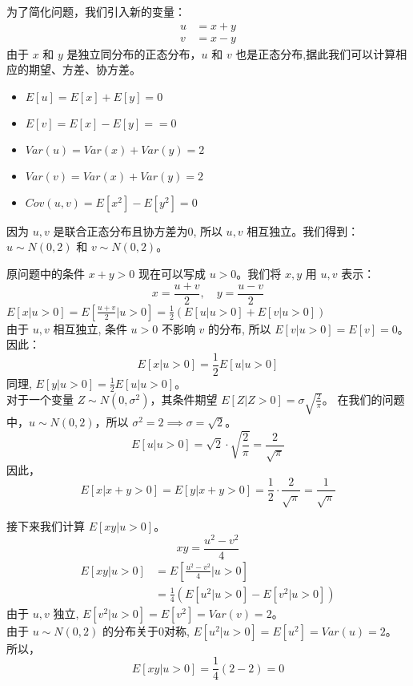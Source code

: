\documentclass[UTF8]{ctexart}
\begin{document}
    为了简化问题，我们引入新的变量：
    \begin{align*}
    u &= x + y \\
    v &= x - y
    \end{align*}
    由于 $x$ 和 $y$ 是独立同分布的正态分布，$u$ 和 $v$ 也是正态分布,据此我们可以计算相应的期望、方差、协方差。
    \begin{itemize}
        \item $E[u] = E[x] + E[y]  = 0$
        \item $E[v] = E[x] - E[y] == 0$
        \item $Var(u) = Var(x) + Var(y) = 2$
        \item $Var(v)  = Var(x) + Var(y) = 2$
        \item $Cov(u, v)  = E[x^2] - E[y^2] = 0$
    \end{itemize}

    因为 $u, v$ 是联合正态分布且协方差为0, 所以 $u, v$ 相互独立。我们得到：\\
    $u \sim N(0, 2)$ 和 $v \sim N(0, 2)$。

    原问题中的条件 $x+y > 0$ 现在可以写成 $u > 0$。我们将 $x, y$ 用 $u, v$ 表示：
    \[ x = \frac{u+v}{2}, \quad y = \frac{u-v}{2} \]
    $E[x | u>0] = E\left[\frac{u+v}{2} \bigg| u>0\right] = \frac{1}{2} (E[u | u>0] + E[v | u>0])$ \\
    由于 $u, v$ 相互独立, 条件 $u>0$ 不影响 $v$ 的分布, 所以 $E[v | u>0] = E[v] = 0$。因此：
    \[ E[x | u>0] = \frac{1}{2} E[u | u>0] \]
    同理, $E[y | u>0] = \frac{1}{2} E[u | u>0]$。\\
    对于一个变量 $Z \sim N(0, \sigma^2)$，其条件期望 $E[Z | Z>0] = \sigma \sqrt{\frac{2}{\pi}}$。
    在我们的问题中，$u \sim N(0, 2)$，所以 $\sigma^2 = 2 \implies \sigma = \sqrt{2}$。
    \[ E[u | u>0] = \sqrt{2} \cdot \sqrt{\frac{2}{\pi}} = \frac{2}{\sqrt{\pi}} \]
    因此，
    \[ E[x | x+y>0] = E[y | x+y>0] = \frac{1}{2} \cdot \frac{2}{\sqrt{\pi}} = \frac{1}{\sqrt{\pi}} \]
    
    接下来我们计算 $E[xy | u>0]$。
    \[ xy = \frac{u^2 - v^2}{4} \]
    \begin{align*}
    E[xy | u>0] &= E\left[\frac{u^2 - v^2}{4} \bigg| u>0\right] \\
    &= \frac{1}{4} (E[u^2 | u>0] - E[v^2 | u>0])
    \end{align*}
    由于 $u,v$ 独立, $E[v^2|u>0] = E[v^2] = Var(v) = 2$。\\
    由于 $u \sim N(0,2)$ 的分布关于0对称, $E[u^2 | u>0] = E[u^2] = Var(u) = 2$。\\
    所以，
    \[ E[xy | u>0] = \frac{1}{4} (2 - 2) = 0 \]
\end{document}
